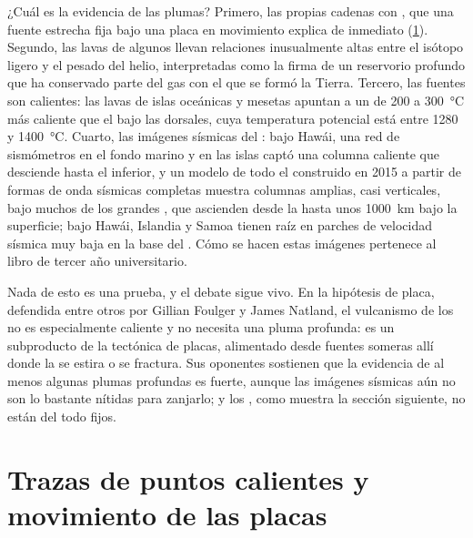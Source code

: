 ¿Cuál es la evidencia de las plumas? Primero, las propias cadenas con , que una fuente estrecha fija bajo una placa en
movimiento explica de inmediato (\cref{sec:b1:hotspots:tracks}). Segundo, las lavas de algunos  llevan relaciones inusualmente
altas entre el isótopo ligero y el pesado del helio, interpretadas como la firma de un reservorio profundo que ha conservado parte del gas con el
que se formó la Tierra. Tercero, las fuentes son calientes: las lavas de islas oceánicas y mesetas apuntan a un  de 200 a \qty{300}{\celsius}
más caliente que el  bajo las dorsales, cuya temperatura potencial está entre 1280 y \qty{1400}{\celsius}. Cuarto, las imágenes sísmicas del
: bajo Hawái, una red de sismómetros en el fondo marino y en las islas captó una columna caliente que desciende hasta el  inferior, y un
modelo de todo el  construido en 2015 a partir de formas de onda sísmicas completas muestra columnas amplias, casi verticales, bajo muchos de
los grandes , que ascienden desde la  hasta unos \qty{1000}{km} bajo la superficie; bajo Hawái, Islandia y
Samoa tienen raíz en parches de velocidad sísmica muy baja en la base del . Cómo se hacen estas imágenes pertenece al libro de tercer año universitario.

Nada de esto es una prueba, y el debate sigue vivo. En la hipótesis de placa, defendida entre otros por Gillian Foulger y James Natland, el vulcanismo
de los  no es especialmente caliente y no necesita una pluma profunda: es un subproducto de la tectónica de placas, alimentado desde
fuentes someras allí donde la  se estira o se fractura. Sus oponentes sostienen que la evidencia de al menos algunas plumas profundas es fuerte,
aunque las imágenes sísmicas aún no son lo bastante nítidas para zanjarlo; y los , como muestra la sección siguiente, no están del todo fijos.

\section{Trazas de puntos calientes y movimiento de las placas}\label{sec:b1:hotspots:tracks}

